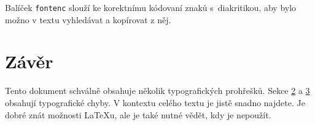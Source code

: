 \documentclass[10pt, a4paper, twocolumn]{article}
\begin{document}
Balíček \texttt{fontenc} slouží ke korektnímu kódovaní znaků s~diakritikou, aby bylo možno v textu vyhledávat a kopírovat z něj.

\section{Závěr}
Tento dokument schválně obsahuje několik typografických prohřešků. Sekce \hyperref[sec:Smíšená sazba]{2} a \hyperref[sec:Další rady:]{3} obsahují typografické chyby. V kontextu celého textu je jistě snadno najdete. Je dobré znát možnosti \LaTeX u, ale je také nutné vědět, kdy je nepoužít.
\end{document}
